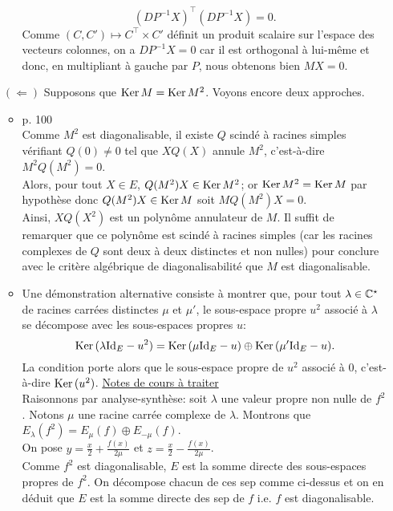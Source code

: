 \begin{preuve}
\begin{itemize}
\begin{itemize}
            $$(D P^{-1} X)^\top (D P^{-1} X) = 0.$$
            Comme $(C, C') \mapsto C^\top \times C'$ définit un produit scalaire sur l'espace des vecteurs colonnes, on a $D P^{-1} X = 0$ car il est orthogonal à lui-même et donc, en multipliant à gauche par $P$, nous obtenons bien $MX = 0$. 
        \end{itemize}
        \item[$(\Leftarrow)$] Supposons que $\mathrm{Ker}\, M = \mathrm{Ker}\, M^2$. Voyons encore deux approches.
        \begin{itemize}
            \item \cite{reduc_des_endo} p. 100 \note 
            \\
            Comme $M^2$ est diagonalisable, il existe $Q$ scindé à racines simples vérifiant $Q(0) \not= 0$ tel que $X Q(X)$ annule $M^2$, c'est-à-dire $M^2 Q(M^2) = 0$. \\
            Alors, pour tout $X \in E$, $Q(M^2)X \in \mathrm{Ker}\, M^2$; or $\mathrm{Ker}\, M^2 = \mathrm{Ker}\, M$ par hypothèse donc $Q(M^2)X \in \mathrm{Ker}\, M$ soit $M Q(M^2)X = 0$. \\
            Ainsi, $XQ(X^2)$ est un polynôme annulateur de $M$. Il suffit de remarquer que ce polynôme est scindé à racines simples (car les racines complexes de $Q$ sont deux à deux distinctes et non nulles) pour conclure avec le critère algébrique de diagonalisabilité que $M$ est diagonalisable.
            \item 
            Une démonstration alternative consiste à montrer que, pour tout $\lambda \in \mathbb{C}^\star$ de racines carrées distinctes $\mu$ et $\mu'$, le sous-espace propre $u^2$ associé à $\lambda$ se décompose avec les sous-espaces propres $u$:
            $$\mathrm{Ker}\,(\lambda \mathrm{Id}_E - u^2) = \mathrm{Ker}\,(\mu \mathrm{Id}_E - u) \oplus \mathrm{Ker}\,(\mu' \mathrm{Id}_E - u).$$
            La condition porte alors que le sous-espace propre de $u^2$ associé à $0$, c'est-à-dire $\mathrm{Ker}\,(u^2)$.
            \underline{Notes de cours à traiter} \\
            Raisonnons par analyse-synthèse: soit $\lambda$ une valeur propre non nulle de $f^2$. Notons $\mu$ une racine carrée complexe de $\lambda$. Montrons que $E_{\lambda}(f^2) = E_{\mu}(f) \oplus E_{-\mu}(f)$. \\
            On pose $y = \frac{x}{2} + \frac{f(x)}{2 \mu}$ et $z = \frac{x}{2} - \frac{f(x)}{2 \mu}$. \\
            Comme $f^2$ est diagonalisable, $E$ est la somme directe des sous-espaces propres de $f^2$. On décompose chacun de ces sep comme ci-dessus et on en déduit que $E$ est la somme directe des sep de $f$ i.e. $f$ est diagonalisable. \\

        \end{itemize}
    \end{itemize}
\end{preuve}
